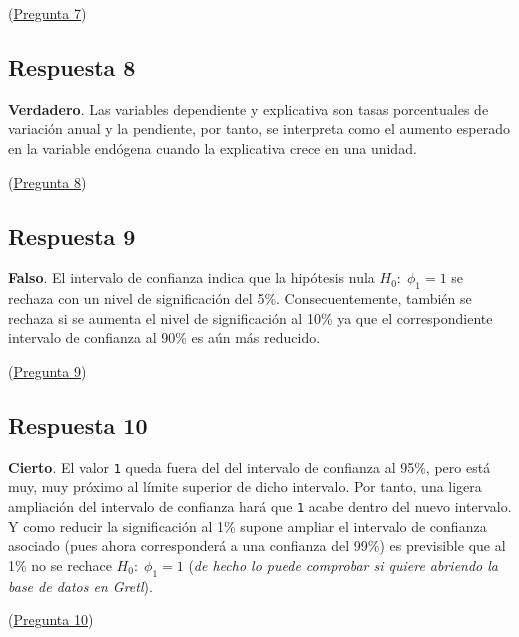 \documentclass[10pt]{article}
\begin{document}
(\hyperref[sec:org954cafd]{Pregunta 7})
\subsection*{Respuesta 8}
\label{sec:org9808af1}

\textbf{Verdadero}. Las variables dependiente y explicativa son tasas
porcentuales de variación anual y la pendiente, por tanto, se
interpreta como el aumento esperado en la variable endógena cuando la
explicativa crece en una unidad.

(\hyperref[sec:org480c145]{Pregunta 8})
\subsection*{Respuesta 9}
\label{sec:org44e2649}

\textbf{Falso}. El intervalo de confianza indica que la hipótesis nula
\(H_0:\; \phi_1=1\) se rechaza con un nivel de significación del
5\%. Consecuentemente, también se rechaza si se aumenta el nivel de
significación al 10\% ya que el correspondiente intervalo de confianza
al 90\% es aún más reducido.

(\hyperref[sec:org55a4a8f]{Pregunta 9})
\subsection*{Respuesta 10}
\label{sec:org4d8e16e}

\textbf{Cierto}. El valor \texttt{1} queda fuera del del intervalo de confianza al
95\%, pero está muy, muy próximo al límite superior de dicho intervalo.
Por tanto, una ligera ampliación del intervalo de confianza hará que
\texttt{1} acabe dentro del nuevo intervalo. Y como reducir la significación
al 1\% supone ampliar el intervalo de confianza asociado (pues ahora
corresponderá a una confianza del 99\%) es previsible que al 1\% no se
rechace \(H_0:\; \phi_1=1\) (\emph{de hecho lo puede comprobar si quiere
abriendo la base de datos en Gretl}).

(\hyperref[sec:org51a4be4]{Pregunta 10})
\end{document}
